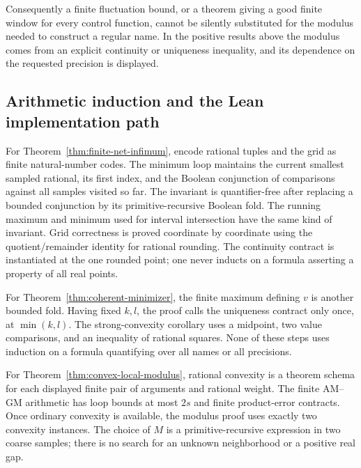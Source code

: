 Consequently a finite fluctuation bound, or a theorem giving a good
finite window for every control function, cannot be silently substituted
for the modulus needed to construct a regular name.  In the positive
results above the modulus comes from an explicit continuity or
uniqueness inequality, and its dependence on the requested precision
is displayed.

\subsection{Arithmetic induction and the Lean implementation path}

For Theorem~\ref{thm:finite-net-infimum}, encode rational tuples and
the grid as finite natural-number codes.  The minimum loop maintains
the current smallest sampled rational, its first index, and the
Boolean conjunction of comparisons against all samples visited so
far.  The invariant is quantifier-free after replacing a bounded
conjunction by its primitive-recursive Boolean fold.  The running
maximum and minimum used for interval intersection have the same
kind of invariant.  Grid correctness is proved coordinate by coordinate
using the quotient/remainder identity for rational rounding.  The
continuity contract is instantiated at the one rounded point; one
never inducts on a formula asserting a property of all real points.

For Theorem~\ref{thm:coherent-minimizer}, the finite maximum defining
$v$ is another bounded fold.  Having fixed $k,l$, the proof calls the
uniqueness contract only once, at $\min(k,l)$.  The strong-convexity
corollary uses a midpoint, two value comparisons, and an inequality
of rational squares.  None of these steps uses induction on a
formula quantifying over all names or all precisions.

For Theorem~\ref{thm:convex-local-modulus}, rational convexity is a
theorem schema for each displayed finite pair of arguments and
rational weight.  The finite AM--GM arithmetic has loop bounds at
most $2s$ and finite product-error contracts.  Once ordinary
convexity is available, the modulus proof uses exactly two convexity
instances.  The choice of $M$ is a primitive-recursive expression
in two coarse samples; there is no search for an unknown neighborhood
or a positive real gap.

